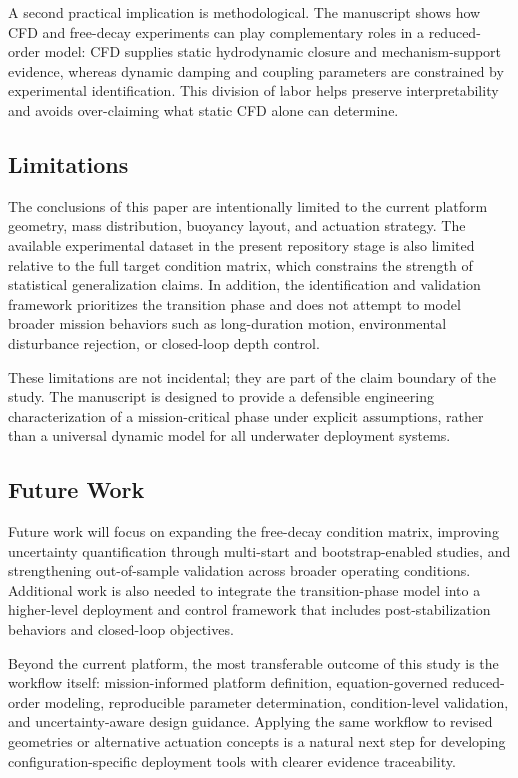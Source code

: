 A second practical implication is methodological. The manuscript shows how CFD and free-decay experiments can play complementary roles in a reduced-order model: CFD supplies static hydrodynamic closure and mechanism-support evidence, whereas dynamic damping and coupling parameters are constrained by experimental identification. This division of labor helps preserve interpretability and avoids over-claiming what static CFD alone can determine.

\subsection{Limitations}

The conclusions of this paper are intentionally limited to the current platform geometry, mass distribution, buoyancy layout, and actuation strategy. The available experimental dataset in the present repository stage is also limited relative to the full target condition matrix, which constrains the strength of statistical generalization claims. In addition, the identification and validation framework prioritizes the transition phase and does not attempt to model broader mission behaviors such as long-duration motion, environmental disturbance rejection, or closed-loop depth control.

These limitations are not incidental; they are part of the claim boundary of the study. The manuscript is designed to provide a defensible engineering characterization of a mission-critical phase under explicit assumptions, rather than a universal dynamic model for all underwater deployment systems.

\subsection{Future Work}

Future work will focus on expanding the free-decay condition matrix, improving uncertainty quantification through multi-start and bootstrap-enabled studies, and strengthening out-of-sample validation across broader operating conditions. Additional work is also needed to integrate the transition-phase model into a higher-level deployment and control framework that includes post-stabilization behaviors and closed-loop objectives.

Beyond the current platform, the most transferable outcome of this study is the workflow itself: mission-informed platform definition, equation-governed reduced-order modeling, reproducible parameter determination, condition-level validation, and uncertainty-aware design guidance. Applying the same workflow to revised geometries or alternative actuation concepts is a natural next step for developing configuration-specific deployment tools with clearer evidence traceability.
